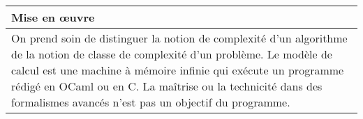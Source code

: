 \begin{longtable}{|p{\lnotion}|p{\comment}|}
    \\
    \hline \hline
    \multicolumn{2}{|p{\lmoe}|}{\textbf{Mise en \oe uvre}} \\
    \hline
    \multicolumn{2}{|p{\lmoe}|}{ 
    On prend soin de distinguer la notion de complexité d'un algorithme de la notion de classe de complexité d'un problème.
    Le modèle de calcul est une machine à mémoire infinie qui exécute un programme rédigé en OCaml ou en C. La maîtrise ou la technicité dans des formalismes avancés n'est pas un objectif du programme.
    } \\
    \hline
\end{longtable}

